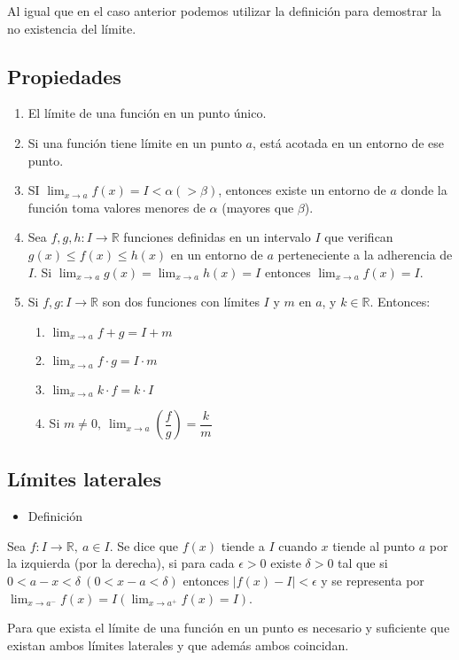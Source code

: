 Al igual que en el caso anterior podemos utilizar la definición para demostrar la no existencia del límite.
\subsection{Propiedades}
\begin{enumerate}[label=\arabic*)]
	\item El límite de una función en un punto único.
	\item Si una función tiene límite en un punto $a$, está acotada en un entorno de ese punto.
	\item SI $\lim_{x\to a}f(x)=I<\alpha(>\beta)$, entonces existe un entorno de $a$ donde la función toma valores menores de $\alpha$ (mayores que $\beta$).
	\item Sea $f,g,h:I\rightarrow\mathbb{R}$ funciones definidas en un intervalo $I$ que verifican $g(x)\le f(x)\le h(x)$ en un entorno de $a$ perteneciente a la adherencia de $I$. Si $\lim_{x\to a}g(x)=\lim_{x\to a}h(x)=I$ entonces $\lim_{x\to a}f(x)=I$.
	\item Si $f,g:I\rightarrow\mathbb{R}$ son dos funciones con límites $I$ y $m$ en $a$, y $k\in\mathbb{R}$. Entonces:
	\begin{enumerate}[label=\alph*)]
		\item $\lim_{x\to a}f+g=I+m$
		\item $\lim_{x\to a}f\cdot g=I\cdot m$
		\item $\lim_{x\to a}k\cdot f=k\cdot I$
		\item Si $m\neq 0,~\lim_{x\to a}\left(\dfrac{f}{g}\right)=\dfrac{k}{m}$
	\end{enumerate}
\end{enumerate}
\subsection{Límites laterales}
\begin{itemize}[label=\color{red}\textbullet, leftmargin=*]
	\item \color{lightblue}Definición
\end{itemize}
Sea $f:I\rightarrow\mathbb{R},~a\in I$. Se dice que $f(x)$ tiende a $I$ cuando $x$ tiende al punto $a$ por la izquierda (por la derecha), si para cada $\epsilon>0$ existe $\delta>0$ tal que si $0<a-x<\delta~(0<x-a<\delta)$ entonces $|f(x)-I|<\epsilon$ y se representa por $\lim_{x\to a^-}f(x)=I\left(\lim_{x\to a^+}f(x)=I\right)$.

Para que exista el límite de una función en un punto es necesario y suficiente que existan ambos límites laterales y que además ambos coincidan.
